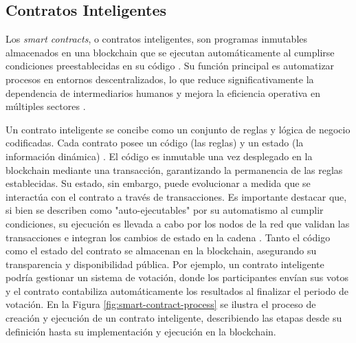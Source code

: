 \subsection{Contratos Inteligentes}

Los \textit{smart contracts}, o contratos inteligentes, son programas inmutables almacenados en una blockchain que se ejecutan automáticamente al cumplirse condiciones preestablecidas en su código \cite{bulkowska2023implementation}. Su función principal es automatizar procesos en entornos descentralizados, lo que reduce significativamente la dependencia de intermediarios humanos \cite{verma2023overview} y mejora la eficiencia operativa en múltiples sectores \cite{sunny2022systematic}.

Un contrato inteligente se concibe como un conjunto de reglas y lógica de negocio codificadas. Cada contrato posee un código (las reglas) y un estado (la información dinámica) \cite{buterin2013ethereum}. El código es inmutable una vez desplegado en la blockchain mediante una transacción, garantizando la permanencia de las reglas establecidas. Su estado, sin embargo, puede evolucionar a medida que se interactúa con el contrato a través de transacciones. Es importante destacar que, si bien se describen como "auto-ejecutables" por su automatismo al cumplir condiciones, su ejecución es llevada a cabo por los nodos de la red que validan las transacciones e integran los cambios de estado en la cadena \cite{buterin2013ethereum}. Tanto el código como el estado del contrato se almacenan en la blockchain, asegurando su transparencia y disponibilidad pública. Por ejemplo, un contrato inteligente podría gestionar un sistema de votación, donde los participantes envían sus votos y el contrato contabiliza automáticamente los resultados al finalizar el periodo de votación. En la Figura \ref{fig:smart-contract-process} se ilustra el proceso de creación y ejecución de un contrato inteligente, describiendo las etapas desde su definición hasta su implementación y ejecución en la blockchain.


